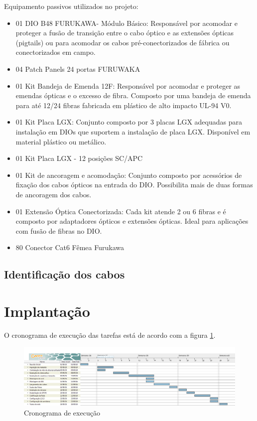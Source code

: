 \documentclass[	DIV=calc,%
							paper=a4,%
							fontsize=12pt,%
							onecolumn]{scrartcl}	 					%
\begin{document}
Equipamento passivos utilizados no projeto:
\begin{itemize}
	\item 01 DIO B48  FURUKAWA- Módulo Básico: Responsável por acomodar e proteger a fusão de transição entre o cabo óptico e as extensões ópticas (pigtails) ou para acomodar os cabos pré-conectorizados de fábrica ou conectorizados em campo.  
	\item 04 Patch Panels 24 portas FURUWAKA
	\item 01 Kit Bandeja de Emenda 12F: Responsável por acomodar e proteger as emendas ópticas e o excesso de fibra. Composto por uma bandeja de emenda para até 12/24 fibras fabricada em plástico de alto impacto UL-94 V0.
	\item 01 Kit Placa LGX: Conjunto composto por 3 placas LGX adequadas para instalação em DIOs que suportem a instalação de placa LGX. Disponível em material plástico ou metálico.
	\item 01 Kit Placa LGX - 12 posições SC/APC
	\item 01 Kit de ancoragem e acomodação: Conjunto composto por acessórios de fixação dos cabos ópticos na entrada do DIO. Possibilita mais de duas formas de ancoragem dos cabos.
	\item 01 Extensão Óptica Conectorizada: Cada kit atende 2 ou 6 fibras e é composto por adaptadores ópticos e extensões ópticas. Ideal para aplicações com fusão de fibras no DIO.
	\item 80 Conector Cat6 Fêmea Furukawa
\end{itemize}

\subsection{Identificação dos cabos}

\section{Implantação}

O cronograma de execução das tarefas está de acordo com a figura \ref{tarefas}.

\begin{figure}
\centering
\includegraphics[width=\textwidth]{tarefas}
\caption{Cronograma de execução}
\label{tarefas}
\end{figure}
\end{document}
